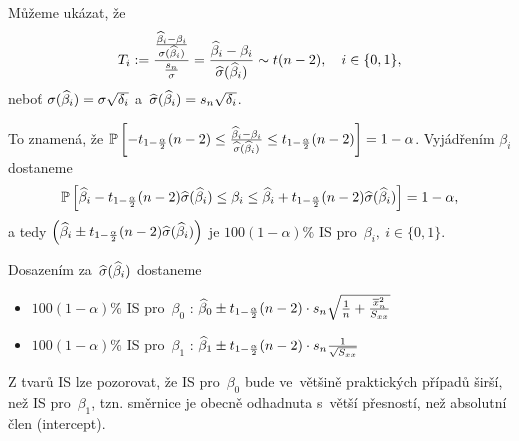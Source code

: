 Můžeme ukázat, že 
 $$
	T_i : = \frac{\frac{\widehat{\beta}_i - \beta_i}{\sigma(\widehat{\beta}_i)}}{\frac{s_n}{\sigma}} = \frac{\widehat{\beta}_i - \beta_i}{\widehat{\sigma}(\widehat{\beta}_i)} \sim t(n-2),\quad i\in\{0,1\},
 $$
neboť $\sigma(\widehat{\beta}_i) = \sigma \sqrt{\delta_i}$ a~$\widehat{\sigma}(\widehat{\beta}_i) = s_n \sqrt{\delta_i}$.

To znamená, že $\mathbb{P}\left[-t_{1-\frac{\alpha}{2}}(n-2) \leq \frac{\widehat{\beta}_i - \beta_i}{\widehat{\sigma}(\widehat{\beta}_i)} \leq t_{1-\frac{\alpha}{2}}(n-2) \right] = 1-\alpha$. Vyjádřením $\beta_i$ dostaneme
 $$
	\mathbb{P}\left[\widehat{\beta}_i - t_{1-\frac{\alpha}{2}}(n-2) \widehat{\sigma}(\widehat{\beta}_i) \leq \beta_i \leq  \widehat{\beta}_i + t_{1-\frac{\alpha}{2}}(n-2) \widehat{\sigma}(\widehat{\beta}_i) \right] = 1 - \alpha,
 $$
a tedy $\left(\widehat{\beta}_i \pm t_{1-\frac{\alpha}{2}}(n-2) \widehat{\sigma}(\widehat{\beta}_i)\right)$ je $100(1-\alpha)\%$ IS pro~$\beta_i,~ i\in\{0,1\}$.

Dosazením za~$\widehat{\sigma}(\widehat{\beta}_i)$ dostaneme

\begin{itemize}
	\item $100(1-\alpha)\%$ IS pro~$\beta_0$ : $\widehat{\beta}_0 \pm t_{1-\frac{\alpha}{2}}(n-2) \cdot s_n \sqrt{\frac{1}{n} + \frac{\overline{x}_n^2}{S_{xx}}}$
	\item $100(1-\alpha)\%$ IS pro~$\beta_1$ : $\widehat{\beta}_1 \pm t_{1-\frac{\alpha}{2}}(n-2) \cdot s_n \frac{1}{\sqrt{S_{xx}}}$
\end{itemize}

\begin{remark}
	Z tvarů IS lze pozorovat, že IS pro~$\beta_0$ bude ve~většině praktických případů širší, než IS pro~$\beta_1$, tzn. směrnice je obecně odhadnuta s~větší přesností, než absolutní člen (intercept).
\end{remark}


